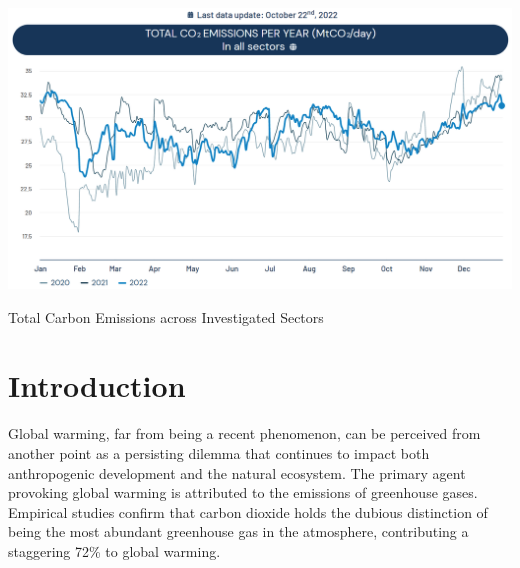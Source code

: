 \documentclass[sigconf, authordraft]{acmart}
\begin{document}
	\begin{teaserfigure}
		\includegraphics[width=\textwidth]{figures/total_carbon_emissions.png}
		\caption{Total Carbon Emissions across Investigated Sectors}
		\Description{} \label{fig:teaser}
	\end{teaserfigure}

	  

	\maketitle


	\section{Introduction}
	Global warming, far from being a recent phenomenon, can be perceived from another
	point as a persisting dilemma that continues to impact both anthropogenic development
	and the natural ecosystem. The primary agent provoking global warming is
	attributed to the emissions of greenhouse gases. Empirical studies confirm that
	carbon dioxide holds the dubious distinction of being the most abundant greenhouse
	gas in the atmosphere, contributing a staggering 72\% to global warming.
\end{document}
